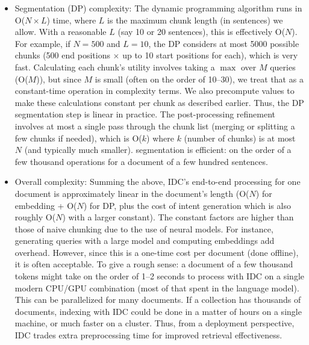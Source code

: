 \documentclass[12pt,a4paper]{report}
\begin{document}
\begin{itemize}
\item Segmentation (DP) complexity: The dynamic programming algorithm runs in O($N \times L$) time, where $L$ is the maximum chunk length (in sentences) we allow. With a reasonable $L$ (say 10 or 20 sentences), this is effectively O($N$). For example, if $N=500$ and $L=10$, the DP considers at most 5000 possible chunks (500 end positions $\times$ up to 10 start positions for each), which is very fast. Calculating each chunk's utility involves taking a $\max$ over $M$ queries (O($M$)), but since $M$ is small (often on the order of 10--30), we treat that as a constant-time operation in complexity terms. We also precompute values to make these calculations constant per chunk as described earlier. Thus, the DP segmentation step is linear in practice. The post-processing refinement involves at most a single pass through the chunk list (merging or splitting a few chunks if needed), which is O($k$) where $k$ (number of chunks) is at most $N$ (and typically much smaller). segmentation is efficient: on the order of a few thousand operations for a document of a few hundred sentences.

\item Overall complexity: Summing the above, IDC's end-to-end processing for one document is approximately linear in the document's length (O($N$) for embedding + O($N$) for DP, plus the cost of intent generation which is also roughly O($N$) with a larger constant). The constant factors are higher than those of naive chunking due to the use of neural models. For instance, generating queries with a large model and computing embeddings add overhead. However, since this is a one-time cost per document (done offline), it is often acceptable. To give a rough sense: a document of a few thousand tokens might take on the order of 1--2 seconds to process with IDC on a single modern CPU/GPU combination (most of that spent in the language model). This can be parallelized for many documents. If a collection has thousands of documents, indexing with IDC could be done in a matter of hours on a single machine, or much faster on a cluster. Thus, from a deployment perspective, IDC trades extra preprocessing time for improved retrieval effectiveness.


\end{itemize}
\end{document}
